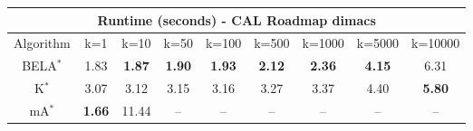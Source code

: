 \begin{tabular}{c|cccccccc}\toprule
\multicolumn{9}{c}{Runtime (seconds) - CAL Roadmap dimacs}\\ \midrule
Algorithm & k=1 & k=10 & k=50 & k=100 & k=500 & k=1000 & k=5000 & k=10000 \\ \midrule
BELA$^*$ & 1.83 & \textbf{1.87} & \textbf{1.90} & \textbf{1.93} & \textbf{2.12} & \textbf{2.36} & \textbf{4.15} & 6.31 \\
K$^*$ & 3.07 & 3.12 & 3.15 & 3.16 & 3.27 & 3.37 & 4.40 & \textbf{5.80} \\
mA$^*$ & \textbf{1.66} & 11.44 & -- & -- & -- & -- & -- & -- \\ \bottomrule 
\end{tabular}
